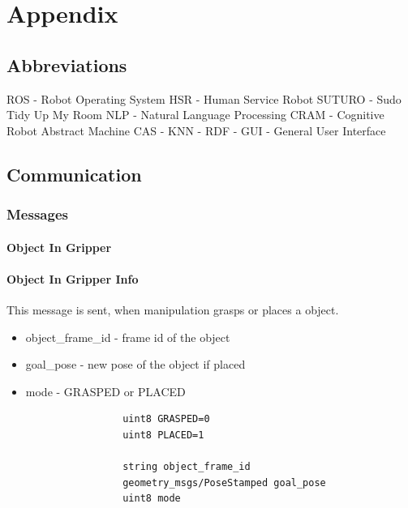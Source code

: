 \documentclass[main.tex]{subfiles}
\begin{document}
\begingroup

\renewcommand{\cleardoublepage}{}

\renewcommand{\clearpage}{}
	\newpage
	\chapter{Appendix}
		\section{Abbreviations}
		ROS - Robot Operating System
		HSR - Human Service Robot
		SUTURO - Sudo Tidy Up My Room
		NLP - Natural Language Processing
		CRAM - Cognitive Robot Abstract Machine
		CAS - 
		KNN - 
		RDF - 
		GUI - General User Interface
		\section{Communication}
			\subsection{Messages}
			\label{msgs}
				\subsubsection{Object In Gripper}\label{msg_obj_in_gripper}
				\subsubsection{Object In Gripper Info}
				This message is sent, when manipulation grasps or places a object.
				\begin{itemize}
					\item object\_frame\_id - frame id of the object
					\item goal\_pose - new pose of the object if placed
					\item mode - GRASPED or PLACED
				\end{itemize}
					\begin{lstlisting}
					uint8 GRASPED=0
					uint8 PLACED=1
		
					string object_frame_id
					geometry_msgs/PoseStamped goal_pose
					uint8 mode
					\end{lstlisting}
\end{document}
